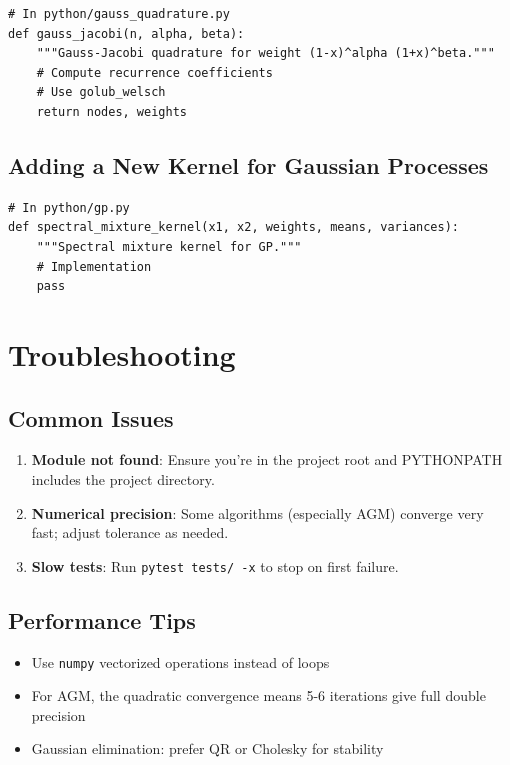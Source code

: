 \documentclass[11pt,a4paper]{article}
\begin{document}
\begin{lstlisting}[style=python]
# In python/gauss_quadrature.py
def gauss_jacobi(n, alpha, beta):
    """Gauss-Jacobi quadrature for weight (1-x)^alpha (1+x)^beta."""
    # Compute recurrence coefficients
    # Use golub_welsch
    return nodes, weights
\end{lstlisting}

\subsection{Adding a New Kernel for Gaussian Processes}

\begin{lstlisting}[style=python]
# In python/gp.py
def spectral_mixture_kernel(x1, x2, weights, means, variances):
    """Spectral mixture kernel for GP."""
    # Implementation
    pass
\end{lstlisting}

\section{Troubleshooting}

\subsection{Common Issues}

\begin{enumerate}
    \item \textbf{Module not found}: Ensure you're in the project root and PYTHONPATH includes the project directory.
    \item \textbf{Numerical precision}: Some algorithms (especially AGM) converge very fast; adjust tolerance as needed.
    \item \textbf{Slow tests}: Run \texttt{pytest tests/ -x} to stop on first failure.
\end{enumerate}

\subsection{Performance Tips}
\begin{itemize}
    \item Use \texttt{numpy} vectorized operations instead of loops
    \item For AGM, the quadratic convergence means 5-6 iterations give full double precision
    \item Gaussian elimination: prefer QR or Cholesky for stability
\end{itemize}
\end{document}
